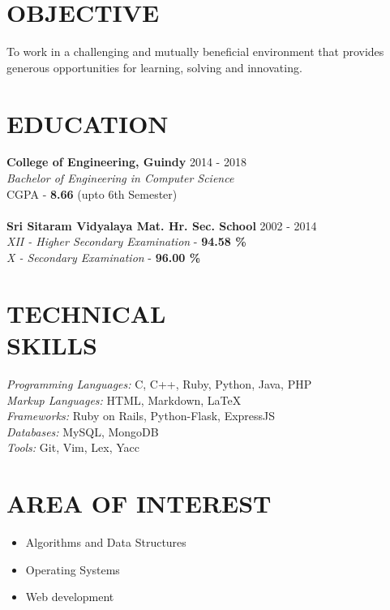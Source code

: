 \documentclass[margin, 10pt]{res} %
\begin{document}
\begin{resume}
\section{OBJECTIVE}
To work in a challenging and mutually beneficial environment that provides generous opportunities for learning, solving and innovating.
\section{EDUCATION}
{\bf College of Engineering, Guindy} \hfill 2014 - 2018 \\
{\sl Bachelor of Engineering in Computer Science} \\
{CGPA - \textbf{8.66} (upto 6th Semester)} \\
\\
{\bf Sri Sitaram Vidyalaya Mat. Hr. Sec. School} \hfill 2002 - 2014 \\
{\sl XII - Higher Secondary Examination} - {\textbf{94.58 \%}} \\
{\sl X - Secondary Examination} - {\textbf{96.00 \%}}
\section{TECHNICAL \\ SKILLS} 
    {\sl Programming Languages:} C, C++, Ruby, Python, Java, PHP \\
{\sl Markup Languages:} HTML, Markdown, LaTeX \\
{\sl Frameworks:} Ruby on Rails, Python-Flask, ExpressJS \\
{\sl Databases:} MySQL, MongoDB \\
{\sl Tools:} Git, Vim, Lex, Yacc
\section{AREA OF INTEREST}
\begin{itemize}
\item Algorithms and Data Structures
\item Operating Systems
\item Web development
\end{itemize}

\end{resume}
\end{document}
